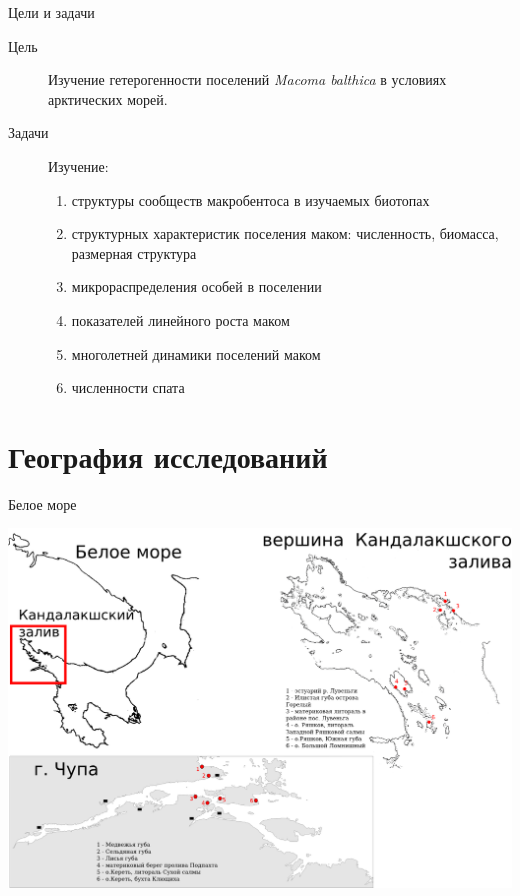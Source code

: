\documentclass{beamer}
\begin{document}
\begin{frame}{Цели и задачи}
\begin{description}
	\item[Цель] Изучение гетерогенности поселений {\it Macoma balthica} в условиях арктических морей.

	\item[Задачи]  Изучение:
		\begin{enumerate}
	    \item структуры сообществ макробентоса в изучаемых биотопах
	    \item структурных характеристик поселения маком: численность, биомасса, размерная структура
	    \item микрораспределения особей в поселении
	    \item показателей линейного роста маком
	    \item многолетней динамики поселений маком
	    \item численности спата
		  \end{enumerate}
\end{description}
\end{frame}

		\section[География]{География исследований}

\begin{frame}{Белое море}
 \begin{center}
	\includegraphics[width=\textwidth]{./White_Sea_map.png}
 \end{center}
\end{frame}
\end{document}
